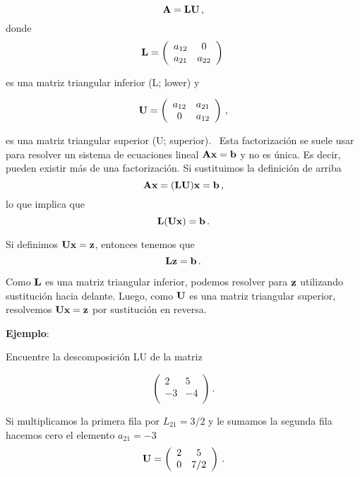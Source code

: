 \documentclass[
]{agujournal2019}
\begin{document}
\[{\textbf A}={\textbf L}{\textbf U}\,,\] donde
\[{\textbf L}=\left(\begin{array}{cccc}
  a_{12} & 0\\
  a_{21} & a_{22}\\
\end{array}\right)\,\]

es una matriz triangular inferior (L; lower) y

\[
{\textbf U}=\left(\begin{array}{cccc}
  a_{12} & a_{21}\\
  0 & a_{12}\\
\end{array}\right)\,,\]

es una matriz triangular superior (U; superior).~ Esta factorización se
suele usar para resolver un sistema de ecuaciones lineal
\({\textbf A}{\textbf x}={\textbf b}\) y no es única. Es decir, pueden
existir más de una factorización. Si sustituimos la definición de arriba
\[{\textbf A}{\textbf x}=({\textbf L}{\textbf U}){\textbf x}={\textbf b}\,,\]
lo que implica que
\[{\textbf L}({\textbf U}{\textbf x})={\textbf b}\,.\]

Si definimos \({\textbf U}{\textbf x}={\textbf z}\), entonces tenemos
que \[{\textbf L}{\textbf z}={\textbf b}\,.\]

Como \({\textbf L}\) es una matriz triangular inferior, podemos resolver
para \({\textbf z}\) utilizando sustitución hacia delante. Luego, como
\({\textbf U}\) es una matriz triangular superior, resolvemos
\({\textbf U}{\textbf x}={\textbf z}\) por sustitución en reversa.

\vspace{0.5cm}

\textbf{Ejemplo}:

Encuentre la descomposición LU de la matriz

\[\left(\begin{array}{ccccc}
  2 & 5\\
 -3 & -4\\
        \end{array}\right)\,.
\]

Si multiplicamos la primera fila por \(L_{21}=3/2\) y le sumamos la
segunda fila hacemos cero el elemento \(a_{21}=-3\)
\[{\textbf U}=\left(\begin{array}{ccccc}
  2 & 5\\
 0 & 7/2\\
        \end{array}\right)\,.
\]
\end{document}
